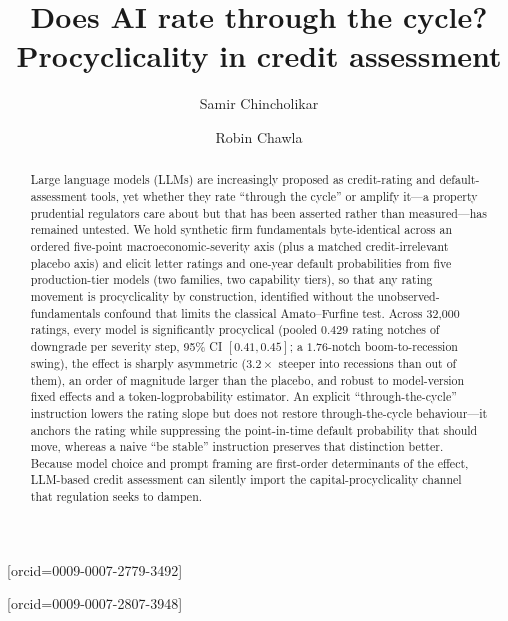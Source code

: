 \documentclass[a4paper,fleqn]{cas-sc}
\begin{document}
\let\WriteBookmarks\relax
\def\floatpagepagefraction{1}
\def\textpagefraction{.001}


\title[mode=title]{Does AI rate through the cycle? Procyclicality in credit assessment}

\author[1]{Samir Chincholikar}[orcid=0009-0007-2779-3492]

\author[2]{Robin Chawla}[orcid=0009-0007-2807-3948]
\cormark[1]


\begin{abstract}
Large language models (LLMs) are increasingly proposed as credit-rating and default-assessment
tools, yet whether they rate ``through the cycle'' or amplify it---a property prudential regulators
care about but that has been asserted rather than measured---has remained untested. We hold
synthetic firm fundamentals byte-identical across an ordered five-point macroeconomic-severity axis
(plus a matched credit-irrelevant placebo axis) and elicit letter ratings and one-year default
probabilities from five production-tier models (two families, two capability tiers), so that any rating movement is procyclicality by
construction, identified without the unobserved-fundamentals confound that limits the classical
Amato--Furfine test. Across 32{,}000 ratings, every model is significantly procyclical (pooled
$0.429$ rating notches of downgrade per severity step, 95\% CI $[0.41,0.45]$; a $1.76$-notch
boom-to-recession swing), the effect is sharply asymmetric ($3.2\times$ steeper into recessions than
out of them), an order of magnitude larger than the placebo, and robust to model-version fixed
effects and a token-log\-probability estimator. An explicit ``through-the-cycle'' instruction lowers
the rating slope but does not restore through-the-cycle behaviour---it anchors the rating while
suppressing the point-in-time default probability that should move, whereas a naive ``be stable''
instruction preserves that distinction better. Because model choice and prompt framing are
first-order determinants of the effect, LLM-based credit assessment can silently import the
capital-procyclicality channel that regulation seeks to dampen.
\end{abstract}
\end{document}
